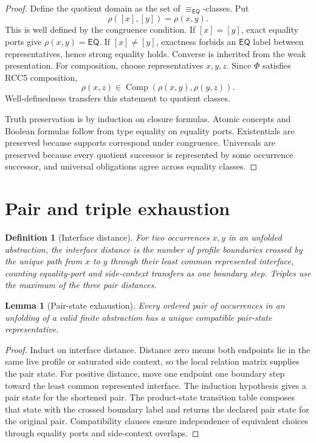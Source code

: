 \documentclass[11pt]{article}
\newtheorem{lemma}[theorem]{Lemma}
\newtheorem{definition}[theorem]{Definition}
\newcommand{\EQ}{\mathsf{EQ}}
\newcommand{\Comp}{\operatorname{Comp}}
\newcommand{\eqE}{\equiv_{\EQ}}
\begin{document}
\begin{proof}
Define the quotient domain as the set of $\eqE$-classes.  Put
\[
  \rho([x],[y])=\rho(x,y).
\]
This is well defined by the congruence condition.  If $[x]=[y]$, exact equality ports give $\rho(x,y)=\EQ$.  If $[x]\ne[y]$, exactness forbids an $\EQ$ label between representatives, hence strong equality holds.  Converse is inherited from the weak presentation.  For composition, choose representatives $x,y,z$.  Since $\Phi$ satisfies RCC5 composition,
\[
  \rho(x,z)\in\Comp(\rho(x,y),\rho(y,z)).
\]
Well-definedness transfers this statement to quotient classes.

Truth preservation is by induction on closure formulas.  Atomic concepts and Boolean formulas follow from type equality on equality ports.  Existentials are preserved because supports correspond under congruence.  Universals are preserved because every quotient successor is represented by some occurrence successor, and universal obligations agree across equality classes.
\end{proof}

\section{Pair and triple exhaustion}

\begin{definition}[Interface distance]
For two occurrences $x,y$ in an unfolded abstraction, the interface distance is the number of profile boundaries crossed by the unique path from $x$ to $y$ through their least common represented interface, counting equality-port and side-context transfers as one boundary step.  Triples use the maximum of the three pair distances.
\end{definition}

\begin{lemma}[Pair-state exhaustion]
Every ordered pair of occurrences in an unfolding of a valid finite abstraction has a unique compatible pair-state representative.
\end{lemma}

\begin{proof}
Induct on interface distance.  Distance zero means both endpoints lie in the same live profile or saturated side context, so the local relation matrix supplies the pair state.  For positive distance, move one endpoint one boundary step toward the least common represented interface.  The induction hypothesis gives a pair state for the shortened pair.  The product-state transition table composes that state with the crossed boundary label and returns the declared pair state for the original pair.  Compatibility clauses ensure independence of equivalent choices through equality ports and side-context overlaps.
\end{proof}
\end{document}
